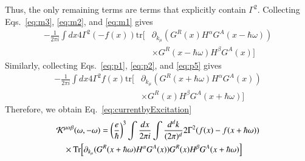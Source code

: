 \documentclass[twocolumn,superscriptaddress]{revtex4-1}
\begin{document}
Thus, the only remaining terms are terms that explicitly contain $\Gamma^2$.
Collecting Eqs.~\eqref{eq:m3}, \eqref{eq:m2}, and \eqref{eq:m1} gives
\begin{align}
  -\frac{1}{2\pi i} \int dx 4\Gamma^2 (-f(x)) \mathrm{tr} [&\partial_{k_\mu} (G^R(x) H^\alpha G^A(x-\hbar\omega) )\nonumber \\
  &\times G^R(x-\hbar\omega) H^\beta G^A(x) ]
\end{align}
Similarly, collecting Eqs.~\eqref{eq:p1}, \eqref{eq:p2}, and \eqref{eq:p5} gives
\begin{align}
  -\frac{1}{2\pi i} \int dx 4\Gamma^2 f(x) \mathrm{tr}[&\partial_{k_\mu} (G^R(x+\hbar\omega) H^\alpha G^A(x) )\nonumber \\
  &\times G^R(x) H^\beta G^A(x+\hbar\omega) ]
\end{align}
Therefore, we obtain Eq.~\eqref{eq:currentbyExcitation}
\begin{align}
  \mathcal{K}&^{\mu\alpha\beta}(\omega,-\omega)=\left(\frac{e}{\hbar}\right)^3\int \frac{dx}{2\pi i}\int \frac{d^d k}{(2\pi)^d} 2\Gamma^2 (f(x)-f(x+\hbar\omega)) \nonumber \\
  &\times \Tr[\partial_{k_\mu} (G^R(x+\hbar\omega) H^\alpha G^A(x) )G^R(x) H^\beta G^A(x+\hbar\omega) ] \label{eq:currentbyExcitationInX}
\end{align}
\end{document}
